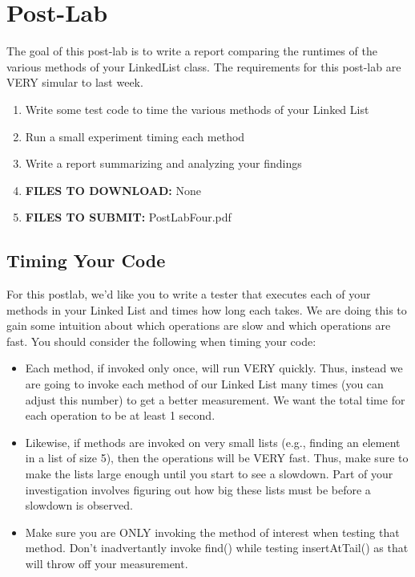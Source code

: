 \documentclass[paper=a4, fontsize=11pt, parskip=full]{scrartcl} %
\numberwithin{equation}{section} %
\numberwithin{figure}{section} %
\numberwithin{table}{section} %
\begin{document}


\newpage
\section{Post-Lab}

The goal of this post-lab is to write a report comparing the runtimes of the various methods of your LinkedList class. The requirements for this post-lab are VERY simular to last week. 

\begin{enumerate}
	\item Write some test code to time the various methods of your Linked List 
	\item Run a small experiment timing each method
	\item Write a report summarizing and analyzing your findings
	\item \textbf{FILES TO DOWNLOAD:} None
	\item \textbf{FILES TO SUBMIT:} PostLabFour.pdf
\end{enumerate}

\subsection{Timing Your Code}

For this postlab, we'd like you to write a tester that executes each of your methods in your Linked List and times how long each takes. We are doing this to gain some intuition about which operations are slow and which operations are fast. You should consider the following when timing your code:

\begin{itemize}
	\item Each method, if invoked only once, will run VERY quickly. Thus, instead we are going to invoke each method of our Linked List many times (you can adjust this number) to get a better measurement. We want the total time for each operation to be at least 1 second.
	\item Likewise, if methods are invoked on very small lists (e.g., finding an element in a list of size 5), then the operations will be VERY fast. Thus, make sure to make the lists large enough until you start to see a slowdown. Part of your investigation involves figuring out how big these lists must be before a slowdown is observed.
	\item Make sure you are ONLY invoking the method of interest when testing that method. Don't inadvertantly invoke find() while testing insertAtTail() as that will throw off your measurement.
\end{itemize}
\end{document}
